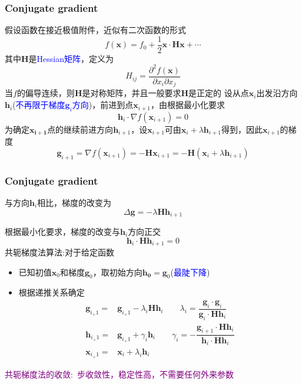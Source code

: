 \documentclass[cjk,slidestop,compress,mathserif,blue]{beamer}
\begin{document}
\frame
{
	\frametitle{\textrm{Conjugate gradient}}
	假设函数在接近极值附件，近似有二次函数的形式
	\begin{displaymath}
		f(\mathbf{x})=f_0+\frac12\mathbf{x}\cdot\mathbf{H}{\mathbf{x}}+\cdots
	\end{displaymath}
	其中$\mathbf{H}$是\textcolor{blue}{\textrm{Hessian}矩阵}，定义为
	\begin{displaymath}
		H_{ij}=\dfrac{\partial^2f(\mathbf{x})}{\partial x_i\partial x_j}
	\end{displaymath}
	当$f$的偏导连续，则$\mathbf{H}$是对称矩阵，并且一般要求$\mathbf{H}$是正定的
	\vskip 20pt
	设从点$\mathbf{x}_i$出发沿方向$\mathbf{h}_i$(\textcolor{blue}{不再限于梯度$\mathbf{g}_i$方向})，前进到点$\mathbf{x}_{i+1}$，由根据最小化要求
	\begin{displaymath}
		\mathbf{h}_i\cdot\nabla f(\mathbf{x}_{i+1})=0
	\end{displaymath}
	为确定$\mathbf{x_{i+1}}$点的继续前进方向$\mathbf{h}_{i+1}$，设$\mathbf{x}_{i+1}$可由$\mathbf{x}_i+\lambda\mathbf{h}_{i+1}$得到，因此$\mathbf{x}_{i+1}$的梯度
	\begin{displaymath}
		\mathbf{g}_{i+1}=\nabla f(\mathbf{x}_{i+1})=-\mathbf{H}\mathbf{x}_{i+1}=-\mathbf{H}(\mathbf{x}_{i}+\lambda\mathbf{h}_{i+1})
	\end{displaymath}
}

\frame
{
	\frametitle{\textrm{Conjugate gradient}}
	与方向$\mathbf{h}_i$相比，梯度的改变为
	\begin{displaymath}
		\Delta\mathbf{g}=-\lambda\mathbf{H}\mathbf{h}_{i+1}
	\end{displaymath}

	根据最小化要求，梯度的改变与$\mathbf{h}_i$方向正交
	\begin{displaymath}
		\mathbf{h}_i\cdot\mathbf{H}\mathbf{h}_{i+1}=0
	\end{displaymath}
	共轭梯度法算法:对于给定函数
	\begin{itemize}
		\item 已知初值$\mathbf{x}_0$和梯度$\mathbf{g}_0$，取初始方向$\mathbf{h_0}=\mathbf{g}_0$(\textcolor{blue}{最陡下降})
		\item 根据递推关系确定
			\begin{displaymath}
				\begin{aligned}
					\mathbf{g}_{i_+1}=&\mathbf{g}_{i_+1}-\lambda_i\mathbf{H}\mathbf{h}_{i}\qquad \lambda_i=\dfrac{\mathbf{g}_i\cdot\mathbf{g}_i}{\mathbf{g}_i\cdot\mathbf{H}\mathbf{h}_i}\\	
					\mathbf{h}_{i_+1}=&\mathbf{g}_{i_+1}+\gamma_i\mathbf{h}_{i}\qquad \gamma_i=-\dfrac{\mathbf{g}_{i+1}\cdot\mathbf{H}\mathbf{h}_i}{\mathbf{h}_i\cdot\mathbf{H}\mathbf{h}_i}\\	
					\mathbf{x}_{i_+1}=&\mathbf{x}_{i}+\lambda_i\mathbf{h}_{i}
				\end{aligned}
			\end{displaymath}
	\end{itemize}
	\textcolor{purple}{共轭梯度法的收敛:~步收敛性，稳定性高，不需要任何外来参数}
}
\end{document}
